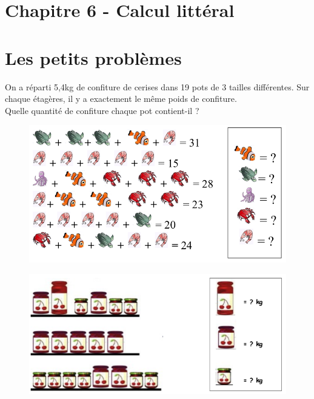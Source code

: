 



\setlength{\columnseprule}{0pt}

\horrule{2px}
\section*{Chapitre 6 - Calcul littéral}
\horrule{2px}

\section*{Les petits problèmes}

\begin{multicols}{2}

  On a réparti 5,4kg de confiture de cerises dans 19 pots de 3 tailles différentes. Sur chaque étagères, il  y a exactement le même poids de confiture. \\
  Quelle quantité de confiture chaque pot contient-il ?
  
  \begin{figure}[H]
    \centering
    \includegraphics[width=0.8\linewidth]{5x6-calcul-litteral/poissons-1.png}
  \end{figure}

  \begin{figure}[H]
    \centering
    \includegraphics[width=0.8\linewidth]{5x6-calcul-litteral/confitures.png}
  \end{figure}


\end{multicols}
